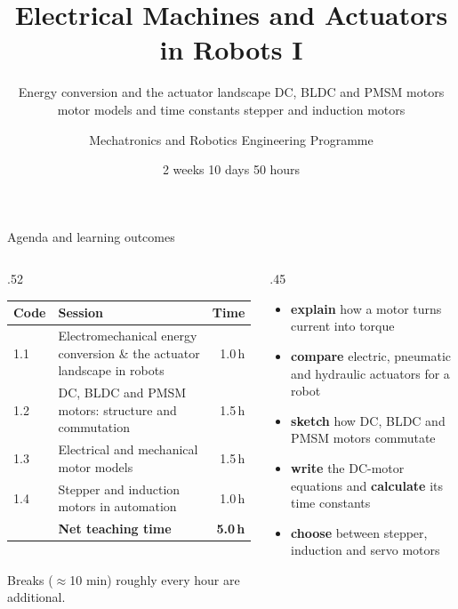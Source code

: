 \documentclass[aspectratio=169,10pt]{beamer}
\title[Machines \& Actuators in Robots I]{Electrical Machines and Actuators in Robots I}
\subtitle{Energy conversion and the actuator landscape \textperiodcentered{} DC, BLDC and PMSM motors\\ \textperiodcentered{} motor models and time constants \textperiodcentered{} stepper and induction motors}
\author{Mechatronics and Robotics Engineering Programme}
\institute{Week 1 \textperiodcentered{} Day 1}
\date{2 weeks \textperiodcentered{} 10 days \textperiodcentered{} 50 hours}
\begin{document}
\begin{frame}[plain]\titlepage\end{frame}

\begin{frame}{Agenda and learning outcomes}
\begin{columns}[T]
\begin{column}{.52\textwidth}
\small
\renewcommand{\arraystretch}{1.15}
\begin{tabular}{@{}l p{4.7cm} r@{}}
\toprule
\textbf{Code} & \textbf{Session} & \textbf{Time}\\
\midrule
1.1 & Electromechanical energy conversion \& the actuator landscape in robots & 1.0\,h\\
1.2 & DC, BLDC and PMSM motors: structure and commutation & 1.5\,h\\
1.3 & Electrical and mechanical motor models & 1.5\,h\\
1.4 & Stepper and induction motors in automation & 1.0\,h\\
\midrule
 & \textbf{Net teaching time} & \textbf{5.0\,h}\\
\bottomrule
\end{tabular}\\[1mm]
{\scriptsize\color{mkGray} Breaks ($\approx$10 min) roughly every hour are additional.}
\end{column}
\begin{column}{.45\textwidth}
\begin{defbox}
\small
\begin{itemize}\setlength\itemsep{1pt}
\item \textbf{explain} how a motor turns current into torque
\item \textbf{compare} electric, pneumatic and hydraulic actuators for a robot
\item \textbf{sketch} how DC, BLDC and PMSM motors commutate
\item \textbf{write} the DC-motor equations and \textbf{calculate} its time constants
\item \textbf{choose} between stepper, induction and servo motors
\end{itemize}
\end{defbox}
\end{column}
\end{columns}
\end{frame}
\end{document}
